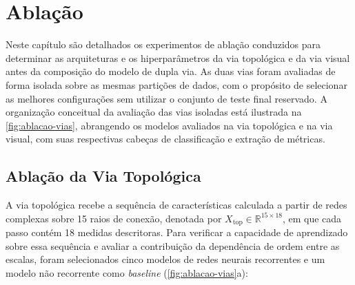 
\providecommand{\pend}{\textbf{[a preencher]}}

\chapter{Ablação}
\label{chap:res-ablacao}

Neste capítulo são detalhados os experimentos de ablação conduzidos para determinar as arquiteturas e os hiperparâmetros da via topológica e da via visual antes da composição do modelo de dupla via. As duas vias foram avaliadas de forma isolada sobre as mesmas partições de dados, com o propósito de selecionar as melhores configurações sem utilizar o conjunto de teste final reservado. A organização conceitual da avaliação das vias isoladas está ilustrada na \ref{fig:ablacao-vias}, abrangendo os modelos avaliados na via topológica e na via visual, com suas respectivas cabeças de classificação e extração de métricas.



\section{Ablação da Via Topológica}
\label{sec:via-topologica}
\label{sec:ablacao-topologica}

A via topológica recebe a sequência de características calculada a partir de redes complexas sobre 15 raios de conexão, denotada por $X_{\mathrm{top}} \in \mathbb{R}^{15 \times 18}$, em que cada passo contém 18 medidas descritoras. Para verificar a capacidade de aprendizado sobre essa sequência e avaliar a contribuição da dependência de ordem entre as escalas, foram selecionados cinco modelos de redes neurais recorrentes e um modelo não recorrente como \textit{baseline} (\ref{fig:ablacao-vias}a):

